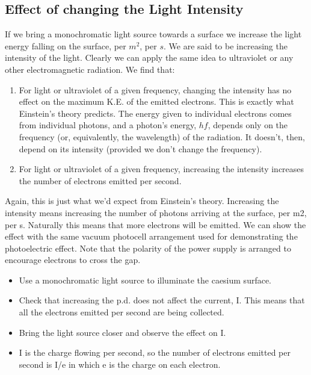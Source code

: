 \subsection{Effect of changing the Light Intensity}
If we bring a monochromatic light source towards a surface we increase the light energy falling on the surface, per $m^2$, per $s$. We are said to be increasing the intensity of the light. Clearly we can apply the same idea to ultraviolet or any other electromagnetic radiation. We find that:
\begin{enumerate}
\item For light or ultraviolet of a given frequency, changing the intensity has no effect on the maximum K.E. of the emitted electrons. This is exactly what Einstein's theory predicts. The energy given to individual electrons comes from individual photons, and a photon's energy, $hf$, depends only on the frequency (or, equivalently, the wavelength) of the radiation. It doesn't, then, depend on its intensity (provided we don't change the frequency).

\item For light or ultraviolet of a given frequency, increasing the intensity increases the number of electrons emitted per second.
\end{enumerate}
Again, this is just what we'd expect from Einstein's theory. Increasing the intensity means increasing the number of photons arriving at the surface, per m2, per s.  Naturally this means that more electrons will be emitted.  
	We can show the effect with the same vacuum photocell arrangement used for demonstrating the photoelectric effect. Note that the polarity of the power supply is arranged to encourage electrons to cross the gap.
    \begin{itemize}
    \item Use a monochromatic light source to illuminate the caesium surface.
\item Check that increasing the p.d. does not affect the current, I. This means that all the electrons emitted per second are being collected.
\item Bring the light source closer and observe the effect on I.
\item I is the charge flowing per second, so the number of electrons emitted per second is I/e in which e is the charge on each electron.
 \end{itemize}





